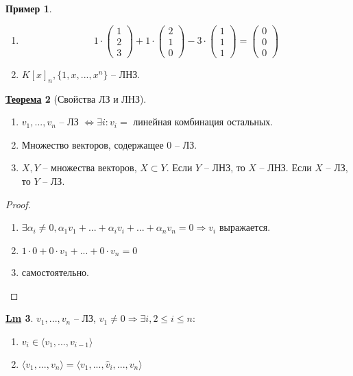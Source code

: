\documentclass[12pt]{article}
\newenvironment{MyList}[1][4pt]{
  \begin{enumerate}[1.]
  \setlength{\parskip}{0pt}
  \setlength{\itemsep}{#1}
}{       
  \end{enumerate}
}
\def\SO{\Rightarrow}     %
\def\EQ{\Leftrightarrow} %
\theoremstyle{definition} %
\newtheorem{Thm}{\underline{Теорема}}[subsection] %
\newtheorem{Lm}[Thm]{\underline{Lm}} %
\newtheorem{Example}[Thm]{Пример} %
\theoremstyle{plain} %
\theoremstyle{remark} %
\begin{document}
{\begin{Example}
\begin{MyList}
        \item \[1 \cdot \begin{pmatrix}
        1 \\ 
        2 \\ 
        3
        \end{pmatrix} + 1 \cdot \begin{pmatrix}
        2 \\ 
        1 \\ 
        0
        \end{pmatrix} - 3 \cdot \begin{pmatrix}
        1 \\ 
        1 \\ 
        1
        \end{pmatrix} = \begin{pmatrix}
        0 \\ 
        0 \\ 
        0
        \end{pmatrix}\]

        \item $K[x]_n, \{1, x, ..., x^n\}$ -- ЛНЗ.
    \end{MyList} 
\end{Example}

\begin{Thm}[Свойства ЛЗ и ЛНЗ]
    \begin{MyList}
        \item $v_1, ..., v_n$ -- ЛЗ $\EQ \exists i : v_i = $ линейная комбинация остальных.
        \item Множество векторов, содержащее 0 -- ЛЗ.
        \item $X, Y$ -- множества векторов, $X \subset Y$. Если $Y$ -- ЛНЗ, то $X$ -- ЛНЗ.
        Если $X$ -- ЛЗ, то $Y$ -- ЛЗ.
    \end{MyList}
\end{Thm}

\begin{proof}
    \begin{MyList}
        \item $\exists \alpha_i \neq 0, \alpha_1 v_1 + ... + \alpha_i v_i + ... + \alpha_n v_n = 0 \SO v_i$ выражается. 
        \item $1 \cdot 0 + 0 \cdot v_1 + ... + 0 \cdot v_n = 0$
        \item самостоятельно.
    \end{MyList}
\end{proof}

\begin{Lm}
    $v_1, ..., v_n$ -- ЛЗ, $v_1 \neq 0 \SO \exists i, 2 \leqslant i \leqslant n : $
    \begin{MyList}
        \item $v_i \in \langle v_1, ..., v_{i - 1} \rangle$
        \item $\langle v_1, ..., v_n \rangle = \langle v_1, ..., \widehat{v}_i, ..., v_n \rangle$  
    \end{MyList}
\end{Lm}

}
\end{document}
